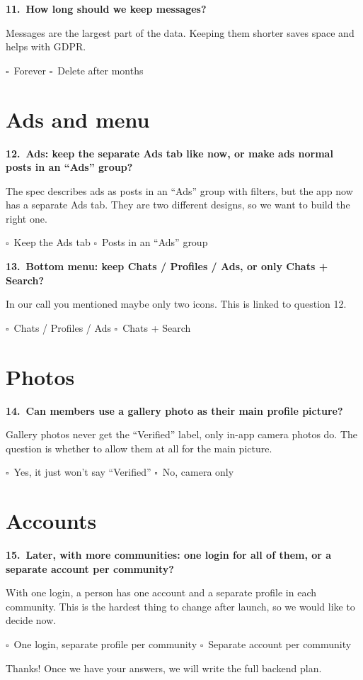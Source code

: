 \documentclass[11pt,a4paper]{article}
\newcommand{\answerbox}{$\square$\ }
\newenvironment{question}[2]
  {\par\medskip\textbf{#1.\ #2}\par\nopagebreak\color{muted}}
  {\par}
\newcommand{\options}[1]{\par\color{black}#1\par}
\begin{document}
\begin{question}{11}{How long should we keep messages?}
Messages are the largest part of the data. Keeping them shorter saves space and helps with GDPR.
\options{\answerbox Forever \qquad \answerbox Delete after \underline{\hspace{1.5cm}} months}
\end{question}

\section{Ads and menu}

\begin{question}{12}{Ads: keep the separate Ads tab like now, or make ads normal posts in an ``Ads'' group?}
The spec describes ads as posts in an ``Ads'' group with filters, but the app now has a separate Ads tab. They are two different designs, so we want to build the right one.
\options{\answerbox Keep the Ads tab \qquad \answerbox Posts in an ``Ads'' group}
\end{question}

\begin{question}{13}{Bottom menu: keep Chats / Profiles / Ads, or only Chats + Search?}
In our call you mentioned maybe only two icons. This is linked to question 12.
\options{\answerbox Chats / Profiles / Ads \qquad \answerbox Chats + Search}
\end{question}

\section{Photos}

\begin{question}{14}{Can members use a gallery photo as their main profile picture?}
Gallery photos never get the ``Verified'' label, only in-app camera photos do. The question is whether to allow them at all for the main picture.
\options{\answerbox Yes, it just won't say ``Verified'' \qquad \answerbox No, camera only}
\end{question}

\section{Accounts}

\begin{question}{15}{Later, with more communities: one login for all of them, or a separate account per community?}
With one login, a person has one account and a separate profile in each community. This is the hardest thing to change after launch, so we would like to decide now.
\options{\answerbox One login, separate profile per community \qquad \answerbox Separate account per community}
\end{question}

\vspace{18pt}
Thanks! Once we have your answers, we will write the full backend plan.
\end{document}
